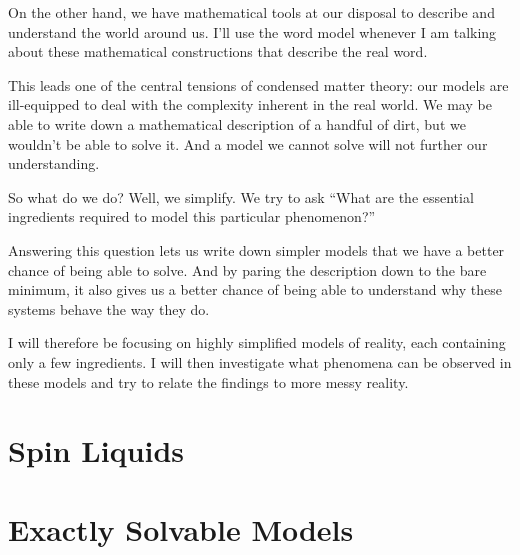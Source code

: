 On the other hand, we have mathematical tools at our disposal to describe and understand the world around us. I'll use the word model whenever I am talking about these mathematical constructions that describe the real word.

This leads one of the central tensions of condensed matter theory: our models are ill-equipped to deal with the complexity inherent in the real world. We may be able to write down a mathematical description of a handful of dirt, but we wouldn't be able to solve it. And a model we cannot solve will not further our understanding.

So what do we do? Well, we simplify. We try to ask ``What are the essential ingredients required to model this particular phenomenon?''

Answering this question lets us write down simpler models that we have a better chance of being able to solve. And by paring the description down to the bare minimum, it also gives us a better chance of being able to understand why these systems behave the way they do.

I will therefore be focusing on highly simplified models of reality, each containing only a few ingredients. I will then investigate what phenomena can be observed in these models and try to relate the findings to more messy reality.

\hypertarget{spin-liquids}{%
\section{Spin Liquids}\label{spin-liquids}}

\hypertarget{exactly-solvable-models}{%
\section{Exactly Solvable Models}\label{exactly-solvable-models}}

\begin{Shaded}
\begin{Highlighting}[]

\end{Highlighting}
\end{Shaded}
